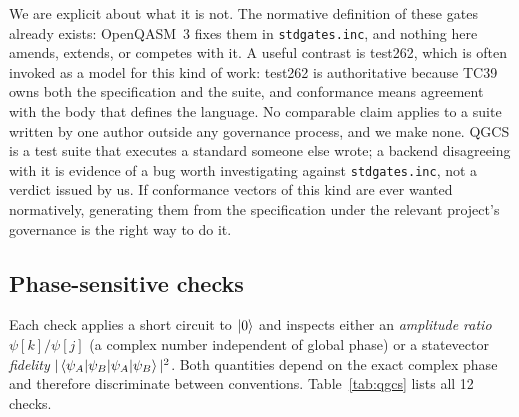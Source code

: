 \documentclass[11pt,a4paper]{article}
\begin{document}
We are explicit about what it is not. The normative definition of these gates
already exists: OpenQASM~3 fixes them in \texttt{stdgates.inc}, and nothing
here amends, extends, or competes with it. A useful contrast is test262, which
is often invoked as a model for this kind of work: test262 is authoritative
because TC39 owns both the specification and the suite, and conformance means
agreement with the body that defines the language. No comparable claim applies
to a suite written by one author outside any governance process, and we make
none. QGCS is a test suite that executes a standard someone else wrote; a
backend disagreeing with it is evidence of a bug worth investigating against
\texttt{stdgates.inc}, not a verdict issued by us. If conformance vectors of
this kind are ever wanted normatively, generating them from the specification
under the relevant project's governance is the right way to do it.

\subsection{Phase-sensitive checks}

Each check applies a short circuit to $\ket{0}$ and inspects either an
\emph{amplitude ratio} $\psi[k]/\psi[j]$ (a complex number independent of
global phase) or a statevector \emph{fidelity} $|\braket{\psi_A|\psi_B}|^2$.
Both quantities depend on the exact complex phase and therefore discriminate
between conventions. Table~\ref{tab:qgcs} lists all 12 checks.
\end{document}
